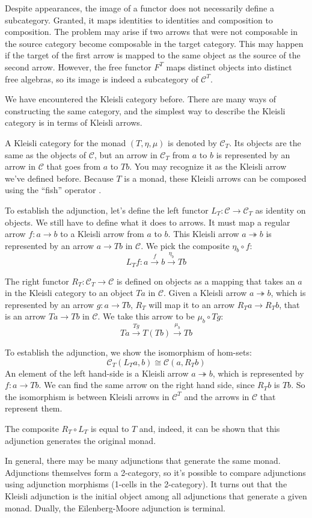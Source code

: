 \documentclass[DaoFP]{subfiles}
\begin{document}
Despite appearances, the image of a functor does not necessarily define a subcategory. Granted, it maps identities to identities and composition to composition. The problem may arise if two arrows that were not composable in the source category become composable in the target category. This may happen if the target of the first arrow is mapped to the same object as the source of the second arrow. However, the free functor $F^T$ maps distinct objects into distinct free algebras, so its image is indeed a subcategory of $\mathcal{C}^T$.

We have encountered the Kleisli category before. There are many ways of constructing the same category, and the simplest way to describe the Kleisli category is in terms of Kleisli arrows. 

A Kleisli category for the monad $(T, \eta, \mu)$ is denoted by $\mathcal{C}_T$. Its objects are the same as the objects of $\mathcal{C}$, but an arrow in $\mathcal{C}_T$ from $a$ to $b$ is represented by an arrow in $\mathcal{C}$ that goes from $a$ to $T b$. You may recognize it as the Kleisli arrow  we've defined before. Because $T$ is a monad, these Kleisli arrows can be composed using the ``fish'' operator \hask{<=<}. 

To establish the adjunction, let's define the left functor $L_T \colon \mathcal{C} \to \mathcal{C}_T$ as identity on objects. We still have to define what it does to arrows. It must map a regular arrow $f \colon a \to b$ to a Kleisli arrow from $a$ to $b$. This Kleisli arrow $a \twoheadrightarrow b$ is represented by an arrow $a \to T b$ in $\mathcal{C}$. We pick the composite $\eta_b \circ f$:
\[ L_T f \colon a \xrightarrow{f} b \xrightarrow{\eta_b} T b\]

The right functor $R_T \colon \mathcal{C}_T \to \mathcal{C}$ is defined on objects as a mapping that takes an $a$ in the Kleisli category to an object $T a$ in $\mathcal{C}$. Given a Kleisli arrow $a \twoheadrightarrow b$, which is represented by an arrow $g \colon a \to T b$, $R_T$ will map it to an arrow $R_T a \to R_T b$, that is an arrow $T a \to T b$ in $\mathcal{C}$. We take this arrow to be $\mu_b \circ T g$:
\[  T a \xrightarrow{T g} T(T b) \xrightarrow{\mu_b} T b\]

To establish the adjunction, we show the isomorphism of hom-sets:
\[\mathcal{C}_T(L_T a, b) \cong \mathcal{C}(a, R_T b)\]
An element of the left hand-side is a Kleisli arrow $a \twoheadrightarrow b$, which is represented by $f \colon a \to T b$. We can find the same arrow on the right hand side, since $R_T b$ is $T b$. So the isomorphism is between Kleisli arrows in $\mathcal{C}^T$ and the arrows in $\mathcal{C}$ that represent them.

The composite $R_T \circ L_T$ is equal to $T$ and, indeed, it can be shown that this adjunction generates the original monad. 

In general, there may be many adjunctions that generate the same monad. Adjunctions themselves form a 2-category, so it's possible to compare adjunctions using adjunction morphisms (1-cells in the 2-category). It turns out that the Kleisli adjunction is the initial object among all adjunctions that generate a given monad. Dually, the Eilenberg-Moore adjunction is terminal. 
\end{document}
